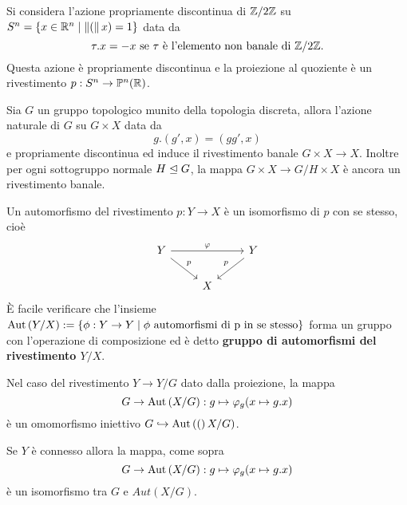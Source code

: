 \documentclass[]{article}
\begin{document}
\begin{example}  \nl
    Si considera l'azione propriamente discontinua di $\mathbb{Z} / 2\mathbb{Z}$ su $S^{n} = \left\{ x \in \mathbb{R}^n \mid \left\| ( \right\|x) = 1 \right\}$ data da
    \[
        \tau.x = -x \text{ se } \tau \text{ \`e l'elemento non banale di } \mathbb{Z} / 2\mathbb{Z}.
    \]
    Questa azione \`e propriamente discontinua e la proiezione al quoziente \`e un rivestimento $p: S^{n} \to \mathbb{P}^{n}\!\left(\mathbb{R}\right)$.
\end{example}

\begin{example}  \nl
    Sia $G$ un gruppo topologico munito della topologia discreta, allora l'azione naturale di $G$ su $G \times X$
    data da 
    \[
        g.\left(g',x\right) = \left(gg', x\right)
    \]
    e propriamente discontinua ed induce il rivestimento banale $G \times X \to X$. \nl
    Inoltre per ogni sottogruppo normale $H \trianglelefteq G$, la mappa $G \times X \to G/H \times X$ \`e ancora
    un rivestimento banale.
\end{example}

\begin{definition}  \nl
    Un automorfismo del rivestimento $p: Y \to X$ \`e un isomorfismo di $p$ con se stesso, cio\`e
    \[\begin{tikzcd}
	{Y} && {Y} \\
	& X
	\arrow["\varphi", from=1-1, to=1-3]
	\arrow["{p}", from=1-1, to=2-2]
	\arrow["{p}"', from=1-3, to=2-2]
    \end{tikzcd}\]
    \`E facile verificare che l'insieme $\mathrm{Aut}\left(Y/X\right) := \left\{ \phi: Y \to Y \mid \phi \text{ automorfismi di p in se stesso} \right\}$
    forma un gruppo con l'operazione di composizione ed \`e detto \textbf{gruppo di automorfismi del rivestimento $Y/X$}.
\end{definition}

\begin{remark} \nl
    Nel caso del rivestimento $Y \to Y/G$ dato dalla proiezione, la mappa 
    \[
        G \to \mathrm{Aut}\left(X/G\right): g \mapsto \varphi_g(x \mapsto g.x)
    \]
    \`e un omomorfismo iniettivo $G \hookrightarrow \mathrm{Aut}\left((\right)X/G)$.
\end{remark}

\begin{proposition} 
    Se $Y$ \`e connesso allora la mappa, come sopra
    \[
        G \to \mathrm{Aut}\left(X/G\right): g \mapsto \varphi_g(x \mapsto g.x)
    \]
    \`e un isomorfismo tra $G$ e $Aut(X/G)$.
\end{proposition}
\end{document}
